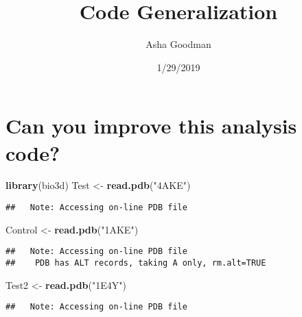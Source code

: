 \documentclass[]{article}
\title{Code Generalization}
\author{Asha Goodman}
\date{1/29/2019}
\newenvironment{Shaded}{\begin{snugshade}}{\end{snugshade}}
\newcommand{\KeywordTok}[1]{\textcolor[rgb]{0.13,0.29,0.53}{\textbf{#1}}}
\newcommand{\StringTok}[1]{\textcolor[rgb]{0.31,0.60,0.02}{#1}}
\newcommand{\NormalTok}[1]{#1}
\begin{document}
\maketitle

\section{Can you improve this analysis
code?}\label{can-you-improve-this-analysis-code}

\begin{Shaded}
\begin{Highlighting}[]
\KeywordTok{library}\NormalTok{(bio3d)}
\NormalTok{Test <-}\StringTok{ }\KeywordTok{read.pdb}\NormalTok{(}\StringTok{"4AKE"}\NormalTok{) }
\end{Highlighting}
\end{Shaded}

\begin{verbatim}
##   Note: Accessing on-line PDB file
\end{verbatim}

\begin{Shaded}
\begin{Highlighting}[]
\NormalTok{Control <-}\StringTok{ }\KeywordTok{read.pdb}\NormalTok{(}\StringTok{"1AKE"}\NormalTok{) }
\end{Highlighting}
\end{Shaded}

\begin{verbatim}
##   Note: Accessing on-line PDB file
##    PDB has ALT records, taking A only, rm.alt=TRUE
\end{verbatim}

\begin{Shaded}
\begin{Highlighting}[]
\NormalTok{Test2 <-}\StringTok{ }\KeywordTok{read.pdb}\NormalTok{(}\StringTok{"1E4Y"}\NormalTok{) }
\end{Highlighting}
\end{Shaded}

\begin{verbatim}
##   Note: Accessing on-line PDB file
\end{verbatim}
\end{document}
